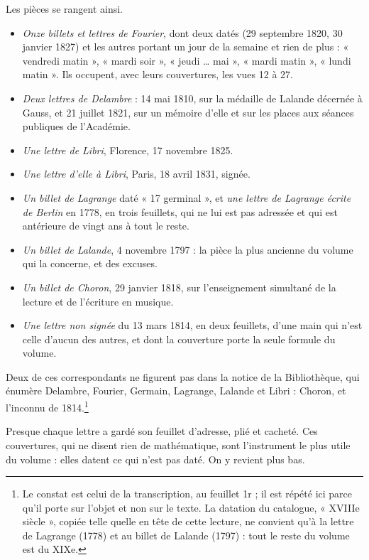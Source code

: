 \documentclass[11pt,a4paper]{article}
\begin{document}
Les pièces se rangent ainsi.

\begin{itemize}
  \item \emph{Onze billets et lettres de Fourier}, dont deux datés (29
    septembre 1820, 30 janvier 1827) et les autres portant un jour de la
    semaine et rien de plus : « vendredi matin », « mardi soir », « jeudi …
    mai », « mardi matin », « lundi matin ». Ils occupent, avec leurs
    couvertures, les vues 12 à 27.
  \item \emph{Deux lettres de Delambre} : 14 mai 1810, sur la médaille de
    Lalande décernée à Gauss, et 21 juillet 1821, sur un mémoire d'elle et sur
    les places aux séances publiques de l'Académie.
  \item \emph{Une lettre de Libri}, Florence, 17 novembre 1825.
  \item \emph{Une lettre d'elle à Libri}, Paris, 18 avril 1831, signée.
  \item \emph{Un billet de Lagrange} daté « 17 germinal », et \emph{une lettre
    de Lagrange écrite de Berlin} en 1778, en trois feuillets, qui ne lui est
    pas adressée et qui est antérieure de vingt ans à tout le reste.
  \item \emph{Un billet de Lalande}, 4 novembre 1797 : la pièce la plus
    ancienne du volume qui la concerne, et des excuses.
  \item \emph{Un billet de Choron}, 29 janvier 1818, sur l'enseignement
    simultané de la lecture et de l'écriture en musique.
  \item \emph{Une lettre non signée} du 13 mars 1814, en deux feuillets,
    d'une main qui n'est celle d'aucun des autres, et dont la couverture porte
    la seule formule du volume.
\end{itemize}

Deux de ces correspondants ne figurent pas dans la notice de la
Bibliothèque, qui énumère Delambre, Fourier, Germain, Lagrange, Lalande et
Libri : Choron, et l'inconnu de 1814.\footnote{Le constat est celui de la
transcription, au feuillet 1r ; il est répété ici parce qu'il porte sur
l'objet et non sur le texte. La datation du catalogue, « XVIIIe siècle »,
copiée telle quelle en tête de cette lecture, ne convient qu'à la lettre de
Lagrange (1778) et au billet de Lalande (1797) : tout le reste du volume
est du XIXe.}

Presque chaque lettre a gardé son feuillet d'adresse, plié et cacheté. Ces
couvertures, qui ne disent rien de mathématique, sont l'instrument le plus
utile du volume : elles datent ce qui n'est pas daté. On y revient plus bas.
\end{document}
